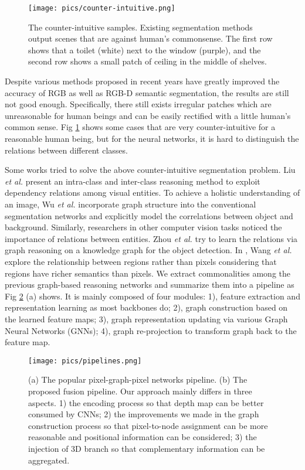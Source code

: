 ﻿\documentclass[journal]{IEEEtran}
\begin{document}
\begin{figure}
    \centering
    \texttt{[image: pics/counter-intuitive.png]}
    \caption{The counter-intuitive samples. Existing segmentation methods output scenes that are against human's commonsense. The first row shows that a toilet (white) next to the window (purple), and the second row shows a small patch of ceiling in the middle of shelves. }
    \label{fig_counter_intuitive}
\end{figure}

 
    Despite various methods proposed in recent years have greatly improved the accuracy of RGB as well as RGB-D semantic segmentation, the results are still not good enough. Specifically, there still exists irregular patches which are unreasonable for human beings and can be easily rectified with a little human's common sense. Fig \ref{fig_counter_intuitive} shows some cases that are very counter-intuitive for a reasonable human being, but for the neural networks, it is hard to distinguish the relations between different classes.

 
    Some works tried to solve the above counter-intuitive segmentation problem. Liu \emph{et al.} \cite{liu2021exploit} present an intra-class and inter-class reasoning method to exploit dependency relations among visual entities. To achieve a holistic understanding of an image, Wu \emph{et al.} \cite{wu2020bidirectional} incorporate graph structure into the conventional segmentation networks and explicitly model the correlations between object and background. Similarly, researchers in other computer vision tasks noticed the importance of relations between entities. Zhou \emph{et al.} \cite{zhou2021relation} try to learn the relations via graph reasoning on a knowledge graph for the object detection. In \cite{wang2020region}, Wang \emph{et al.} explore the relationship between regions rather than pixels considering that regions have richer semantics than pixels. We extract commonalities among the previous graph-based reasoning networks and summarize them into a pipeline as Fig \ref{fig_pipeline} (a) shows. It is mainly composed of four modules: 1), feature extraction and representation learning as most backbones do; 2), graph construction based on the learned feature maps; 3), graph representation updating via various Graph Neural Networks (GNNs); 4), graph re-projection to transform graph back to the feature map. 
    
\begin{figure}
    \centering
    \texttt{[image: pics/pipelines.png]}
    \caption{(a) The popular pixel-graph-pixel networks pipeline. (b) The proposed fusion pipeline. Our approach mainly differs in three aspects. 1) the encoding process so that depth map can be better consumed by CNNs; 2) the improvements we made in the graph construction process so that pixel-to-node assignment can be more reasonable and positional information can be considered; 3) the injection of 3D branch so that complementary information can be aggregated.}
    \label{fig_pipeline}
\end{figure}
 
\end{document}
